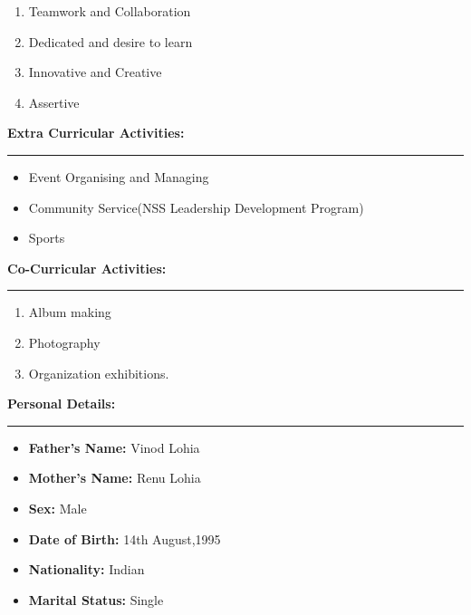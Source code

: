 \documentclass[a4paper,10pt]{article}
\begin{document}
\begin{flushleft}
\begin{enumerate}
    	\item Teamwork and Collaboration\\
    	\item Dedicated and desire to learn\\
    	\item Innovative and Creative\\
    	\item Assertive\\
    \end{enumerate}
    \textbf{\large Extra Curricular Activities:}\\
  \hrule
  \begin{itemize}
  	\item Event Organising and Managing\\
  	\item Community Service(NSS Leadership Development Program)\\
  	\item Sports\\
  \end{itemize}
  
  \textbf{\large Co-Curricular Activities:}\\
  \hrule
  \begin{enumerate}
  	\item Album making\\
  	\item Photography\\
  	\item Organization exhibitions.\\
  \end{enumerate}
  \textbf{\large Personal Details:}\\
   \hrule
    \begin{itemize}
    	\item  \textbf{Father's Name:} Vinod Lohia\\
    	\item  \textbf{Mother's Name:} Renu Lohia\\
    	\item  \textbf{Sex:} Male\\
    	\item  \textbf{Date of Birth:} 14th August,1995\\
    	\item  \textbf{Nationality:}   Indian\\
    	\item  \textbf{Marital Status:}  Single\\
    \end{itemize}
\end{flushleft}
\end{document}

